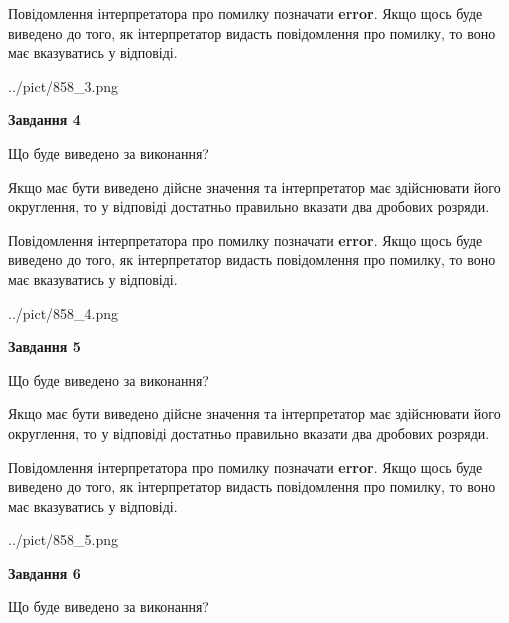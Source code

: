 \documentclass[12pt, ukrainian]{article}
\begin{document}
{\begin {Large}
Повідомлення інтерпретатора про помилку позначати \textbf{error}.
Якщо щось буде виведено до того, як інтерпретатор видасть повідомлення про помилку, 
то воно має вказуватись у відповіді. \par

\begin{center}
	{../pict/858_3.png}
\end{center}
\newpage

{\begin {center}\textbf{Завдання 4}\end {center}}\par
Що буде виведено за виконання? \par

Якщо має бути виведено дійсне значення та інтерпретатор має здійснювати його округлення, 
то у відповіді достатньо правильно вказати два дробових розряди.

Повідомлення інтерпретатора про помилку позначати \textbf{error}.
Якщо щось буде виведено до того, як інтерпретатор видасть повідомлення про помилку, 
то воно має вказуватись у відповіді. \par

\begin{center}
	{../pict/858_4.png}
\end{center}
\newpage

{\begin {center}\textbf{Завдання 5}\end {center}}\par
Що буде виведено за виконання? \par

Якщо має бути виведено дійсне значення та інтерпретатор має здійснювати його округлення, 
то у відповіді достатньо правильно вказати два дробових розряди.

Повідомлення інтерпретатора про помилку позначати \textbf{error}.
Якщо щось буде виведено до того, як інтерпретатор видасть повідомлення про помилку, 
то воно має вказуватись у відповіді. \par

\begin{center}
	{../pict/858_5.png}
\end{center}
\newpage

{\begin {center}\textbf{Завдання 6}\end {center}}\par
Що буде виведено за виконання? \par


\end{Large}}
\end{document}
